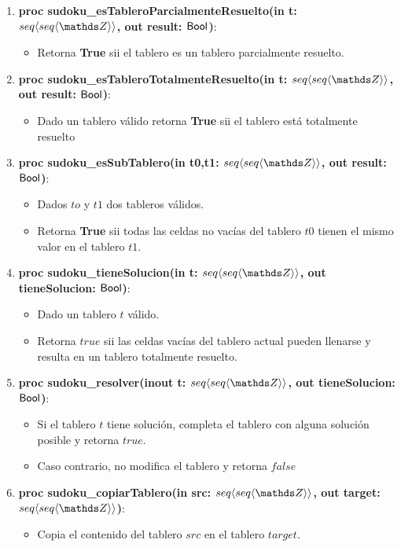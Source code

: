 \documentclass[spanish,a4paper]{article}
\begin{document}
\begin{enumerate}
\item \textbf{proc sudoku\_esTableroParcialmenteResuelto(in t: $\TLista{\TLista{\ent}}$, out result: $\mathsf{Bool}$)}:
\begin{itemize}
\item Retorna \textbf{True} sii el tablero es un tablero parcialmente resuelto.
\end{itemize}

\item \textbf{proc sudoku\_esTableroTotalmenteResuelto(in t: $\TLista{\TLista{\ent}}$, out result: $\mathsf{Bool}$)}: 
\begin{itemize}
\item Dado un tablero v\'alido retorna \textbf{True} sii el tablero est\'a totalmente resuelto
\end{itemize}


\item \textbf{proc sudoku\_esSubTablero(in t0,t1: $\TLista{\TLista{\ent}}$, out result: $\mathsf{Bool}$)}:
\begin{itemize}
\item Dados $to$ y $t1$ dos tableros v\'alidos.
\item Retorna \textbf{True} sii todas las celdas no vac\'ias del tablero $t0$ tienen el mismo valor en el tablero $t1$.
\end{itemize}

\item \textbf{proc sudoku\_tieneSolucion(in t: $\TLista{\TLista{\ent}}$, out tieneSolucion: $\mathsf{Bool}$)}:  
\begin{itemize}
\item Dado un tablero $t$ v\'alido. 
\item Retorna $true$ sii las celdas vac\'ias del tablero actual pueden llenarse y resulta en un tablero totalmente resuelto.  
\end{itemize}

\item \textbf{proc sudoku\_resolver(inout t: $\TLista{\TLista{\ent}}$, out tieneSolucion: $\mathsf{Bool}$)}:  
\begin{itemize}
\item Si el tablero $t$ tiene soluci\'on, completa el tablero con alguna soluci\'on posible y retorna $true$. 
\item Caso contrario, no modifica el tablero y retorna $false$
\end{itemize}

\item \textbf{proc sudoku\_copiarTablero(in src: $\TLista{\TLista{\ent}}$, out target: $\TLista{\TLista{\ent}}$)}:
\begin{itemize}
\item Copia el contenido del tablero $src$ en el tablero $target$.
\end{itemize}

\end{enumerate}
\end{document}
